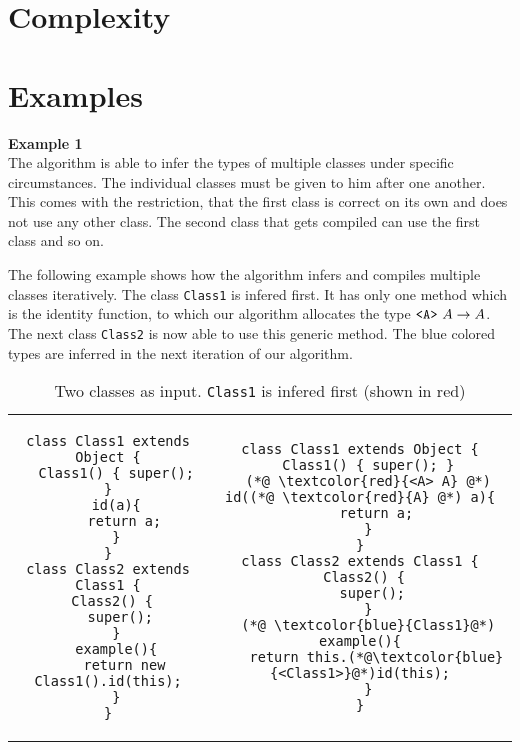 \documentclass[a4paper,USenglish,cleveref, autoref, thm-restate]{lipics-v2021}
\begin{document}
\section{Complexity}
\label{sec:complexity}



\section{Examples}
\label{sec:examples}



\textbf{Example 1}\\
The algorithm is able to infer the types of multiple classes under specific circumstances.
The individual classes must be given to him after one another.
This comes with the restriction, that the first class is correct on its own and does not use any other class.
The second class that gets compiled can use the first class and so on.

The following example shows how the algorithm infers and compiles multiple classes iteratively.
The class \texttt{Class1} is infered first.
It has only one method which is the identity function,
to which our algorithm allocates the type $\mathtt{ \texttt{<} A \texttt{>} }\ A \to A$.
The next class \texttt{Class2} is now able to use this generic method.
The blue colored types are inferred in the next iteration of our algorithm.

\begin{table}
\caption{Two classes as input. \texttt{Class1} is infered first (shown in {\color{red}red})}
\begin{tabular}{cc}
\begin{lstlisting}
class Class1 extends Object {
  Class1() { super(); }
  id(a){
    return a;
  }
}
class Class2 extends Class1 {
  Class2() { 
    super(); 
  }
  example(){
    return new Class1().id(this);
  }
}
\end{lstlisting}
&
\begin{lstlisting}
class Class1 extends Object {
  Class1() { super(); }
  (*@ \textcolor{red}{<A> A} @*) id((*@ \textcolor{red}{A} @*) a){
    return a;
  }
}
class Class2 extends Class1 {
  Class2() { 
    super(); 
  }
  (*@ \textcolor{blue}{Class1}@*) example(){
    return this.(*@\textcolor{blue}{<Class1>}@*)id(this);
  }
}
\end{lstlisting}
\end{tabular}
\end{table}
\end{document}
